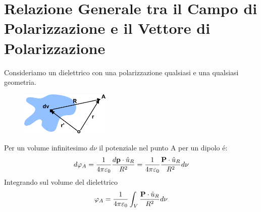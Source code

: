  \begin{center}
 \end{center}

\section{Relazione Generale tra il Campo di Polarizzazione e il Vettore di Polarizzazione}
Consideriamo un dielettrico con una polarizzazione qualsiasi e una qualsiasi geometria.
\begin{figure} %
    \centering
    \includegraphics[width=0.38\textwidth]{images/poldistro} %
\end{figure}
Per un volume infinitesimo $d \nu$  il potenziale nel punto A per un dipolo \'e:
\begin{equation*}
	d \varphi_{A} = \frac{1}{4 \pi \varepsilon_0} \frac{d \bold{p} \cdot \hat{u}_{R}}{R^2} = \frac{1}{4 \pi \varepsilon_0} \frac{\bold{P} \cdot \hat{u}_{R}}{R^2}d\nu
\end{equation*}
Integrando sul volume del dielettrico
\begin{equation}
	\varphi_{A} = \frac{1}{4 \pi \varepsilon_0} \int_{V} \frac{\bold{P} \cdot \hat{u}_{R}}{R^2}d \nu
\end{equation}

